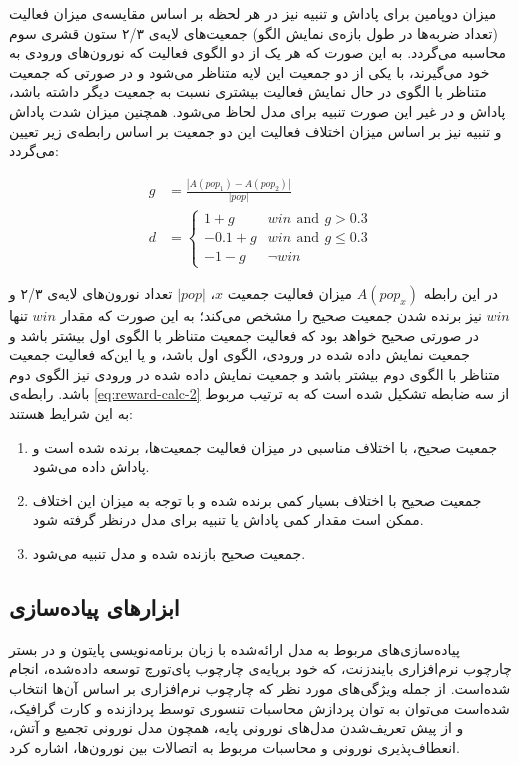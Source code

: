 \documentclass[12pt]{report}
\begin{document}
	میزان دوپامین برای پاداش و تنبیه نیز در هر لحظه بر اساس مقایسه‌ی میزان فعالیت (تعداد ضربه‌ها در طول بازه‌ی نمایش الگو) جمعیت‌های لایه‌ی ۲/۳ ستون قشری سوم محاسبه می‌گردد. به این صورت که هر یک از دو الگوی فعالیت که نورون‌های ورودی به خود می‌گیرند، با یکی از دو جمعیت این لایه متناظر می‌شود و در صورتی که جمعیت متناظر با الگوی در حال نمایش فعالیت بیشتری نسبت به جمعیت دیگر داشته باشد، پاداش و در غیر این صورت تنبیه برای مدل لحاظ می‌شود. همچنین میزان شدت پاداش و تنبیه نیز بر اساس میزان اختلاف فعالیت این دو جمعیت بر اساس رابطه‌ی زیر تعیین می‌گردد: 
	
	\begin{subequations}
	\begin{align}
		g &= \frac{| A(pop_1) - A(pop_2) |}{|pop|} \\ 
		d &=
		\begin{cases}
			1 + g & win \,~\text{and}~\, g > 0.3\\
			-0.1 + g & win \,~\text{and}~\, g \le 0.3\\
			-1 - g & \neg win
		\end{cases}  
		\label{eq:reward-calc-2}
	\end{align}
\end{subequations}

در این رابطه $A(pop_x)$ میزان فعالیت جمعیت $x$، $|pop|$ تعداد نورون‌های لایه‌ی ۲/۳ و $win$ نیز برنده شدن جمعیت صحیح را مشخص می‌کند؛ به این صورت که مقدار $win$ تنها در صورتی صحیح خواهد بود که فعالیت جمعیت متناظر با الگوی اول بیشتر باشد و جمعیت نمایش داده شده در ورودی، الگوی اول باشد، و یا این‌که فعالیت جمعیت متناظر با الگوی دوم بیشتر باشد و جمعیت نمایش داده شده در ورودی نیز الگوی دوم باشد. رابطه‌ی \ref{eq:reward-calc-2} از سه ضابطه تشکیل شده است که به ترتیب مربوط به این شرایط هستند:
\begin{enumerate}
	\item جمعیت صحیح، با اختلاف مناسبی در میزان فعالیت جمعیت‌ها، برنده شده است و پاداش داده می‌شود.
	\item جمعیت صحیح با اختلاف بسیار کمی برنده شده و با توجه به میزان این اختلاف ممکن است مقدار کمی پاداش یا تنبیه برای مدل درنظر گرفته شود.
	\item  جمعیت صحیح بازنده شده و مدل تنبیه می‌شود.
\end{enumerate} 
	

	\subsection{ابزار‌های پیاده‌سازی}
	
	پیاده‌سازی‌های مربوط به مدل ارائه‌شده با زبان برنامه‌نویسی پایتون و در بستر چارچوب نرم‌افزاری بایندزنت، که خود برپایه‌ی چارچوب پای‌تورچ توسعه داده‌شده‌، انجام شده‌است. از جمله ویژگی‌های مورد نظر که چارچوب نرم‌افزاری بر اساس آن‌ها انتخاب شده‌است می‌توان به توان پردازش محاسبات تنسوری توسط پردازنده و کارت گرافیک، و از پیش تعریف‌شدن مدل‌های نورونی پایه، همچون مدل نورونی تجمیع و آتش، انعطاف‌پذیری نورونی و محاسبات مربوط به اتصالات بین نورون‌ها، اشاره کرد.
	
\end{document}
